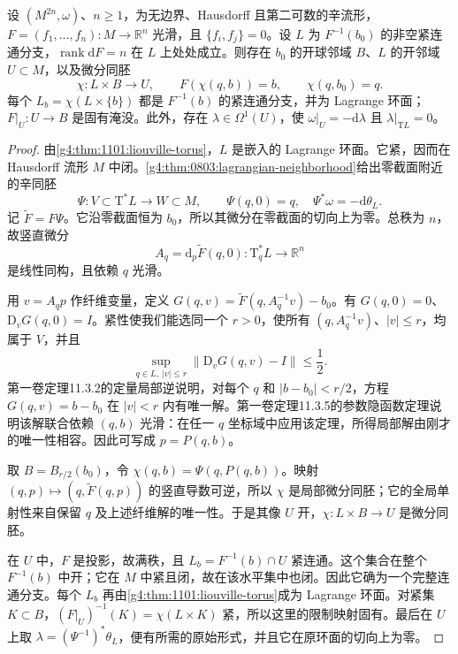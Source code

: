 \begin{lemma}\label{g4:lem:1102:compact-fibration}
	设 \((M^{2n},\omega)\)、\(n\ge1\)，为无边界、Hausdorff 且第二可数的辛流形，\(F=(f_1,\ldots,f_n):M\to\mathbb R^n\) 光滑，且 \(\{f_i,f_j\}=0\)。设 \(L\) 为 \(F^{-1}(b_0)\) 的非空紧连通分支，\(\operatorname{rank}\mathrm{d}F=n\) 在 \(L\) 上处处成立。则存在 \(b_0\) 的开球邻域 \(B\)、\(L\) 的开邻域 \(U\subset M\)，以及微分同胚
	\[
		\chi:L\times B\longrightarrow U,\qquad
		F(\chi(q,b))=b,\qquad \chi(q,b_0)=q.
	\]
	每个 \(L_b=\chi(L\times\{b\})\) 都是 \(F^{-1}(b)\) 的紧连通分支，并为 Lagrange 环面；\(F|_U:U\to B\) 是固有淹没。此外，存在 \(\lambda\in\Omega^1(U)\)，使 \(\omega|_U=-\mathrm{d}\lambda\) 且 \(\lambda|_{\mathrm{T}L}=0\)。
\end{lemma}
\begin{proof}
	由\cref{g4:thm:1101:liouville-torus}，\(L\) 是嵌入的 Lagrange 环面。它紧，因而在 Hausdorff 流形 \(M\) 中闭。\cref{g4:thm:0803:lagrangian-neighborhood}给出零截面附近的辛同胚
	\[
		\Psi:V\subset\mathrm{T}^*L\longrightarrow W\subset M,\qquad
		\Psi(q,0)=q,\quad \Psi^*\omega=-\mathrm{d}\theta_L.
	\]
	记 \(\widetilde F=F\Psi\)。它沿零截面恒为 \(b_0\)，所以其微分在零截面的切向上为零。总秩为 \(n\)，故竖直微分
	\[
		A_q=\mathrm{d}_p\widetilde F(q,0):
		\mathrm{T}_q^*L\longrightarrow\mathbb R^n
	\]
	是线性同构，且依赖 \(q\) 光滑。

	用 \(v=A_qp\) 作纤维变量，定义
	\(G(q,v)=\widetilde F(q,A_q^{-1}v)-b_0\)。有
	\(G(q,0)=0\)、\(\mathrm{D}_vG(q,0)=I\)。紧性使我们能选同一个 \(r>0\)，使所有 \((q,A_q^{-1}v)\)、\(|v|\le r\)，均属于 \(V\)，并且
	\[
		\sup_{q\in L,\ |v|\le r}\|\mathrm{D}_vG(q,v)-I\|\le\frac12.
	\]
	第一卷定理11.3.2的定量局部逆说明，对每个 \(q\) 和 \(|b-b_0|<r/2\)，方程 \(G(q,v)=b-b_0\) 在 \(|v|<r\) 内有唯一解。第一卷定理11.3.5的参数隐函数定理说明该解联合依赖 \((q,b)\) 光滑：在任一 \(q\) 坐标域中应用该定理，所得局部解由刚才的唯一性相容。因此可写成 \(p=P(q,b)\)。

	取 \(B=B_{r/2}(b_0)\)，令 \(\chi(q,b)=\Psi(q,P(q,b))\)。映射
	\((q,p)\mapsto(q,\widetilde F(q,p))\) 的竖直导数可逆，所以 \(\chi\) 是局部微分同胚；它的全局单射性来自保留 \(q\) 及上述纤维解的唯一性。于是其像 \(U\) 开，\(\chi:L\times B\to U\) 是微分同胚。

	在 \(U\) 中，\(F\) 是投影，故满秩，且 \(L_b=F^{-1}(b)\cap U\) 紧连通。这个集合在整个 \(F^{-1}(b)\) 中开；它在 \(M\) 中紧且闭，故在该水平集中也闭。因此它确为一个完整连通分支。每个 \(L_b\) 再由\cref{g4:thm:1101:liouville-torus}成为 Lagrange 环面。对紧集 \(K\subset B\)，\((F|_U)^{-1}(K)=\chi(L\times K)\) 紧，所以这里的限制映射固有。最后在 \(U\) 上取
	\(\lambda=(\Psi^{-1})^*\theta_L\)，便有所需的原始形式，并且它在原环面的切向上为零。
\end{proof}

